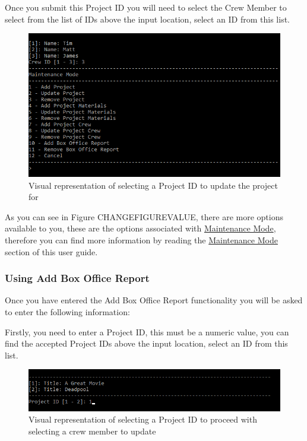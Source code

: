 \documentclass[
  english,
  a4paper,
,tablecaptionabove
]{scrartcl}
\begin{document}
Once you submit this Project ID you will need to select the Crew Member
to select from the list of IDs above the input location, select an ID
from this list.

\begin{figure}
\centering
\includegraphics{images/user-guide/maintenance-mode/remove-crew-select-id.png}
\caption{Visual representation of selecting a Project ID to update the
project for}
\end{figure}

As you can see in Figure CHANGEFIGUREVALUE, there are more options
available to you, these are the options associated with
\protect\hyperlink{using-maintenance-mode}{Maintenance Mode}, therefore
you can find more information by reading the
\protect\hyperlink{using-maintenance-mode}{Maintenance Mode} section of
this user guide.

\newpage

\hypertarget{using-add-box-office-report}{%
\subsubsection{Using Add Box Office
Report}\label{using-add-box-office-report}}

Once you have entered the Add Box Office Report functionality you will
be asked to enter the following information:

Firstly, you need to enter a Project ID, this must be a numeric value,
you can find the accepted Project IDs above the input location, select
an ID from this list.

\begin{figure}
\centering
\includegraphics{images/user-guide/maintenance-mode/update-project-select-id.png}
\caption{Visual representation of selecting a Project ID to proceed with
selecting a crew member to update}
\end{figure}
\end{document}
